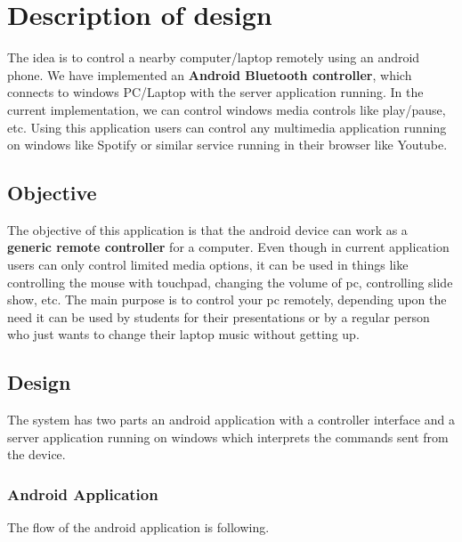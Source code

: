 \documentclass{article}
\title{
Exercise 3: Small IoT Implementation
\bigskip
\author{Andrei Golubev 2621924 \\ Hassan Shaheen 2600602}
\date{\parbox{\linewidth}{\centering
  \endgraf\bigskip
  University of Oulu, Oulu, Finland
  \endgraf\monthyeardate\today}}
}
\begin{document}
\maketitle
\thispagestyle{empty}
\newpage

\section{Description of design}

The idea is to control a nearby computer/laptop remotely using an android phone. We have implemented an
\textbf{Android Bluetooth controller}, which connects to windows PC/Laptop with the server application
running. In the current implementation, we can control windows media controls like play/pause, etc.
Using this application users can control any multimedia application running on windows like Spotify
or similar service running in their browser like Youtube.

\subsection{Objective}

The objective of this application is that the android device can work as a \textbf{generic remote
controller} for a computer. Even though in current application users can only control limited media
options, it can be used in things like controlling the mouse with touchpad, changing the volume of
pc, controlling slide show, etc.  The main purpose is to control your pc remotely, depending upon
the need it can be used by students for their presentations or by a regular person who just wants to
change their laptop music without getting up.

\subsection{Design}
The system has two parts an android application with a controller interface and a server application
running on windows which interprets the commands sent from the device.

\subsubsection{Android Application}
The flow of the android application is following.
\end{document}
